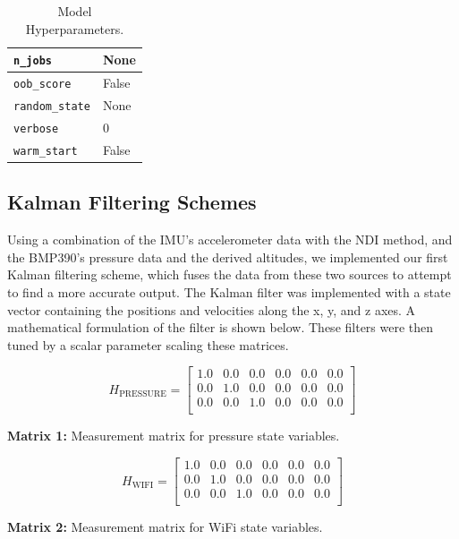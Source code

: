 \begin{table}[h!]
\begin{tabular}{|l|l|}
\texttt{n\_jobs}                   & None                       \\ \hline
\texttt{oob\_score}                & False                      \\ \hline
\texttt{random\_state}             & None                       \\ \hline
\texttt{verbose}                   & 0                          \\ \hline
\texttt{warm\_start}               & False                      \\ \hline
\end{tabular}
\caption{Model Hyperparameters.}
\label{tab:model_hyperparameters}
\end{table}
\par

\subsection{Kalman Filtering Schemes}
Using a combination of the IMU's accelerometer data with the NDI method, and the BMP390's pressure data and the derived altitudes, we implemented our first Kalman filtering scheme, which fuses the data from these two sources to attempt to find a more accurate output. The Kalman filter was implemented with a state vector containing the positions and velocities along the x, y, and z axes. A mathematical formulation of the filter is shown below. These filters were then tuned by a scalar parameter scaling these matrices.
\par
\[
H_{\text{PRESSURE}} =
\begin{bmatrix}
1.0 & 0.0 & 0.0 & 0.0 & 0.0 & 0.0 \\
0.0 & 1.0 & 0.0 & 0.0 & 0.0 & 0.0 \\
0.0 & 0.0 & 1.0 & 0.0 & 0.0 & 0.0 \\
\end{bmatrix}
\]
\begin{center}
\textbf{Matrix 1:} Measurement matrix for pressure state variables.
\end{center}


\[
H_{\text{WIFI}} =
\begin{bmatrix}
1.0 & 0.0 & 0.0 & 0.0 & 0.0 & 0.0 \\
0.0 & 1.0 & 0.0 & 0.0 & 0.0 & 0.0 \\
0.0 & 0.0 & 1.0 & 0.0 & 0.0 & 0.0 \\
\end{bmatrix}
\]
\begin{center}
\textbf{Matrix 2:} Measurement matrix for WiFi state variables.
\end{center}


